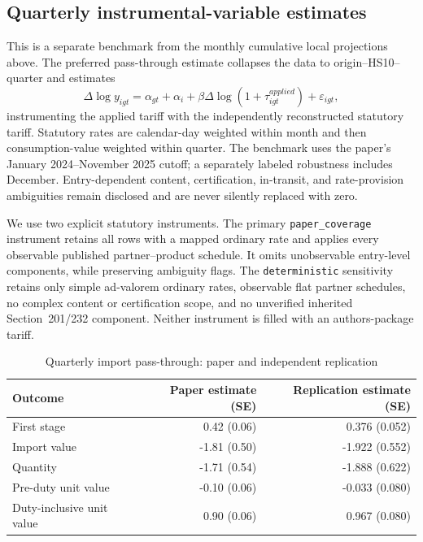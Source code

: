 \subsection{Quarterly instrumental-variable estimates}

This is a separate benchmark from the monthly cumulative local projections
above. The preferred pass-through estimate collapses the data to
origin--HS10--quarter and estimates
\begin{equation}
\Delta\log y_{igt}
=\alpha_{gt}+\alpha_i+
\beta\Delta\log(1+\tau^{applied}_{igt})+\varepsilon_{igt},
\end{equation}
instrumenting the applied tariff with the independently reconstructed
statutory tariff.  Statutory rates are calendar-day weighted within month and
then consumption-value weighted within quarter.  The benchmark uses the
paper's January 2024--November 2025 cutoff; a separately labeled robustness
includes December.  Entry-dependent content, certification, in-transit, and
rate-provision ambiguities remain disclosed and are never silently replaced
with zero.

We use two explicit statutory instruments. The primary
\texttt{paper\_coverage} instrument retains all rows with a mapped ordinary
rate and applies every observable published partner--product schedule. It
omits unobservable entry-level components, while preserving ambiguity flags.
The \texttt{deterministic} sensitivity retains only simple ad-valorem ordinary
rates, observable flat partner schedules, no complex content or certification
scope, and no unverified inherited Section~201/232 component. Neither
instrument is filled with an authors-package tariff.

\begin{table}[ht]
\centering
\caption{Quarterly import pass-through: paper and independent replication}
\label{tab:fk2025-table4}
\begin{tabular}{lrr}
\toprule
Outcome & Paper estimate (SE) & Replication estimate (SE)\\
\midrule
First stage & 0.42 (0.06) & 0.376 (0.052)\\
Import value & -1.81 (0.50) & -1.922 (0.552)\\
Quantity & -1.71 (0.54) & -1.888 (0.622)\\
Pre-duty unit value & -0.10 (0.06) & -0.033 (0.080)\\
Duty-inclusive unit value & 0.90 (0.06) & 0.967 (0.080)\\
\bottomrule
\end{tabular}
\end{table}

